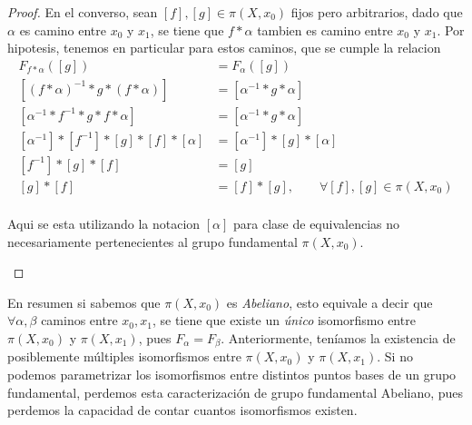 {\begin{proof}
  En el converso, sean \([f],[g] \in \pi (X, x_0) \) fijos pero
  arbitrarios, dado que \(\alpha\) es camino entre \(x_0\) y \(x_1\), se
  tiene que \(f * \alpha\) tambien es camino entre \(x_0\) y \(x_1\).
  Por hipotesis, tenemos en particular para estos caminos, que se cumple
  la relacion
  \begin{align*}
    F_{f * \alpha} ([g]) &= F_{\alpha} ([g]) \\
    [(f * \alpha)^{-1} * g * (f * \alpha) ] &= [\alpha^{-1} * g * \alpha] \\
    [\alpha^{-1} * f^{-1} * g * f * \alpha ] &= [\alpha^{-1} * g * \alpha] \\
    [\alpha^{-1}] * [f^{-1}] * [g] * [f] * [\alpha] &= [\alpha^{-1}] *
        [g] * [\alpha] \\
    [f^{-1}] * [g] * [f] &= [g] \\
    [g] * [f] &= [f] * [g], \qquad \forall [f],[g] \in \pi (X, x_0) \\
  \end{align*}

  \begin{acotacion}
    Aqui se esta utilizando la notacion \( [\alpha]\) para clase de
    equivalencias no necesariamente pertenecientes al grupo fundamental
    \(\pi (X, x_0)\).
  \end{acotacion}
\end{proof}

En resumen si sabemos que \(\pi (X, x_0)\) es \emph{Abeliano}, esto equivale a
decir que \(\forall \alpha,\beta\) caminos entre \(x_0, x_1\), se tiene
que existe un \emph{único} isomorfismo entre \(\pi (X,x_0) \) y \( \pi
(X,x_1)\), pues \(F_\alpha = F_\beta\). Anteriormente, teníamos la
existencia de posiblemente múltiples isomorfismos entre \(\pi (X, x_0)
\) y \(\pi (X, x_1) \). Si no podemos parametrizar los isomorfismos
entre distintos puntos bases de un grupo fundamental, perdemos esta
caracterización de grupo fundamental Abeliano, pues perdemos la capacidad
de contar cuantos isomorfismos existen.

}
